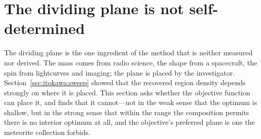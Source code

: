 %
%
%
%

\section{The dividing plane is not self-determined}
\label{sec:plane}

The dividing plane is the one ingredient of the method that is neither
measured nor derived. The mass comes from radio science, the shape from a
spacecraft, the spin from lightcurves and imaging; the plane is placed by
the investigator. Section~\ref{sec:itokawa:sweep} showed that the recovered
region density depends strongly on where it is placed. This section asks
whether the objective function can place it, and finds that it cannot---not
in the weak sense that the optimum is shallow, but in the strong sense that
within the range the composition permits there is no interior optimum at
all, and the objective's preferred plane is one the meteorite collection
forbids.

